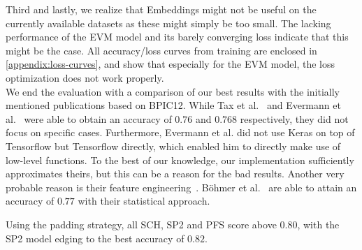 Third and lastly, we realize that Embeddings might not be useful on the currently available datasets as these might simply be too small. The lacking performance of the EVM model and its barely converging loss indicate that this might be the case. All accuracy/loss curves from training are enclosed in \autoref{appendix:loss-curves}, and show that especially for the EVM model, the loss optimization does not work properly.\\

We end the evaluation with a comparison of our best results with the initially mentioned publications based on BPIC12. While Tax et al.~\cite{tax2017} and Evermann et al.~\cite{evermann2016} were able to obtain an accuracy of $0.76$ and $0.768$ respectively, they did not focus on specific cases. Furthermore, Evermann et al. did not use Keras on top of Tensorflow but Tensorflow directly, which enabled him to directly make use of low-level functions. To the best of our knowledge, our implementation sufficiently approximates theirs, but this can be a reason for the bad results. Another very probable reason is their feature engineering~\cite{evermann2016}.
Böhmer et al.~\cite{boehmer2018probability} are able to attain an accuracy of $0.77$ with their statistical approach.

Using the padding strategy, all SCH, SP2 and PFS score above $0.80$, with the SP2 model edging to the best accuracy of $0.82$.
